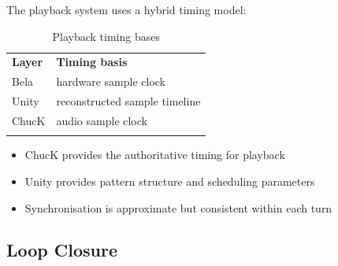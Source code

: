 The playback system uses a hybrid timing model:

\begin{longtable}[]{@{}
  >{\raggedright\arraybackslash}p{}
  >{\raggedright\arraybackslash}p{}@{}}
\caption{Playback timing bases}\label{tab:playback-timing-bases}\\
\toprule\noalign{}
\begin{minipage}[b]{\linewidth}\centering
\textbf{Layer}
\end{minipage} & \begin{minipage}[b]{\linewidth}\centering
\textbf{Timing basis}
\end{minipage} \\
\begin{minipage}[b]{\linewidth}\raggedright
Bela
\end{minipage} & \begin{minipage}[b]{\linewidth}\raggedright
hardware sample clock
\end{minipage} \\
\begin{minipage}[b]{\linewidth}\raggedright
Unity
\end{minipage} & \begin{minipage}[b]{\linewidth}\raggedright
reconstructed sample timeline
\end{minipage} \\
\begin{minipage}[b]{\linewidth}\raggedright
ChucK
\end{minipage} & \begin{minipage}[b]{\linewidth}\raggedright
audio sample clock
\end{minipage} \\
\midrule\noalign{}
\endhead
\bottomrule\noalign{}
\endlastfoot
\end{longtable}


\begin{itemize}
\item
  ChucK provides the authoritative timing for playback
\item
  Unity provides pattern structure and scheduling parameters
\item
  Synchronisation is approximate but consistent within each turn
\end{itemize}

\subsection{Loop Closure}\label{loop-closure}

